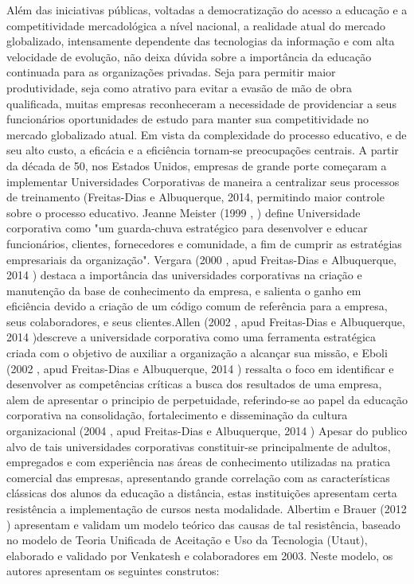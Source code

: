 Além das iniciativas públicas, voltadas a democratização do acesso a educação e a competitividade mercadológica a nível nacional, a realidade atual do mercado globalizado, intensamente dependente das tecnologias da informação e com alta velocidade de evolução, não deixa dúvida sobre a importância da educação continuada para as organizações privadas. Seja para permitir maior produtividade, seja como atrativo para evitar a evasão de mão de obra qualificada, muitas empresas reconheceram a necessidade de providenciar a seus funcionários oportunidades de estudo para manter sua competitividade no mercado globalizado atual. Em vista da complexidade do processo educativo, e de seu alto custo, a eficácia e a eficiência tornam-se preocupações centrais. A partir da década de 50, nos Estados Unidos, empresas de grande porte começaram a implementar Universidades Corporativas de maneira a centralizar seus processos de treinamento (Freitas-Dias e Albuquerque, 2014\cite{Freitas_Albuquerque_2014}, permitindo maior controle sobre o processo educativo. Jeanne Meister (1999 \cite{Meister_1999}, ) define Universidade corporativa como "um guarda-chuva estratégico para desenvolver e educar  funcionários, clientes, fornecedores e comunidade, a fim de cumprir as estratégias empresariais da organização". Vergara (2000 \cite{Vergara_2000}, apud Freitas-Dias e Albuquerque, 2014 \cite{Freitas_Albuquerque_2014}) destaca a importância das universidades corporativas na criação e manutenção da base de conhecimento da empresa, e salienta o ganho em eficiência devido a criação de um código comum de referência para a empresa, seus colaboradores, e seus clientes.Allen (2002 \cite{Allen_2002}, apud Freitas-Dias e Albuquerque, 2014 \cite{Freitas_Albuquerque_2014})descreve a universidade corporativa como uma ferramenta estratégica criada com o objetivo de auxiliar a organização a alcançar sua missão, e Eboli (2002 \cite{Eboli_2002}, apud Freitas-Dias e Albuquerque, 2014 \cite{Freitas_Albuquerque_2014}) ressalta o foco em identificar e desenvolver as competências críticas a busca dos resultados de uma empresa, alem de apresentar o principio de perpetuidade, referindo-se ao papel da educação corporativa na consolidação, fortalecimento e disseminação da cultura organizacional (2004 \cite{Eboli_2004}, apud Freitas-Dias e Albuquerque, 2014 \cite{Freitas_Albuquerque_2014})
Apesar do publico alvo de tais universidades corporativas constituir-se principalmente de adultos, empregados e com experiência nas áreas de conhecimento utilizadas na pratica comercial das empresas, apresentando grande correlação com as características clássicas dos alunos da educação a distância, estas instituições apresentam certa resistência a implementação de cursos nesta modalidade. Albertim e Brauer (2012 \cite{Albertin_Brauer_2012}) apresentam e validam um modelo teórico das causas de tal resistência, baseado no modelo de Teoria Unificada de Aceitação e Uso da Tecnologia (Utaut), elaborado e validado por Venkatesh e colaboradores em 2003. Neste modelo, os autores apresentam os seguintes construtos:

